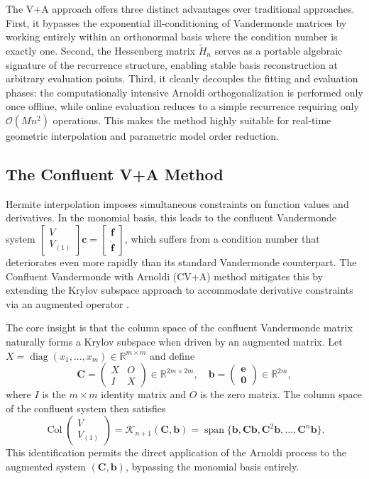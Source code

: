 \documentclass[11pt]{article}
\begin{document}
The V+A approach offers three distinct advantages over traditional approaches. First, it bypasses the exponential ill-conditioning of Vandermonde matrices by working entirely within an orthonormal basis where the condition number is exactly one. Second, the Hessenberg matrix $\tilde{H}_n$ serves as a portable algebraic signature of the recurrence structure, enabling stable basis reconstruction at arbitrary evaluation points. Third, it cleanly decouples the fitting and evaluation phases: the computationally intensive Arnoldi orthogonalization is performed only once offline, while online evaluation reduces to a simple recurrence requiring only $\mathcal{O}(M n^2)$ operations. This makes the method highly suitable for real-time geometric interpolation and parametric model order reduction.

\subsection{The Confluent V+A Method}

Hermite interpolation imposes simultaneous constraints on function values and derivatives. In the monomial basis, this leads to the confluent Vandermonde system $\begin{bmatrix} V \\ V_{(1)} \end{bmatrix} \mathbf{c} = \begin{bmatrix} \mathbf{f} \\ \dot{\mathbf{f}} \end{bmatrix}$, which suffers from a condition number that deteriorates even more rapidly than its standard Vandermonde counterpart. The Confluent Vandermonde with Arnoldi (CV+A) method mitigates this by extending the Krylov subspace approach to accommodate derivative constraints via an augmented operator \cite{niu2022confluent}.

The core insight is that the column space of the confluent Vandermonde matrix naturally forms a Krylov subspace when driven by an augmented matrix. Let $X = \operatorname{diag}(x_1,\ldots,x_m) \in \mathbb{R}^{m\times m}$ and define
 $$
\mathbf{C} = \begin{pmatrix} X & O \\ I & X \end{pmatrix} \in \mathbb{R}^{2m \times 2m}, \quad \mathbf{b} = \begin{pmatrix} \mathbf{e} \\ \mathbf{0} \end{pmatrix} \in \mathbb{R}^{2m},  $$
where $I$ is the $m\times m$ identity matrix and $O$ is the zero matrix. The column space of the confluent system then satisfies
 $$
\operatorname{Col}\begin{pmatrix} V \\ V_{(1)} \end{pmatrix} = \mathcal{K}_{n+1}(\mathbf{C}, \mathbf{b}) = \operatorname{span}\{\mathbf{b}, \mathbf{C}\mathbf{b}, \mathbf{C}^2\mathbf{b}, \ldots, \mathbf{C}^n\mathbf{b}\}.  $$
This identification permits the direct application of the Arnoldi process to the augmented system $(\mathbf{C}, \mathbf{b})$, bypassing the monomial basis entirely.
\end{document}
